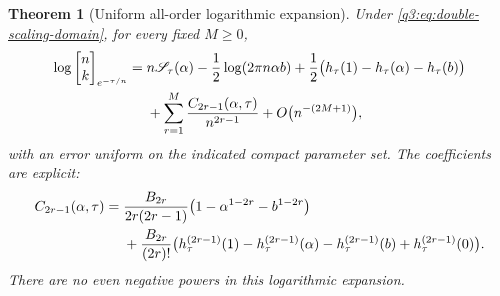 \documentclass[11pt,a4paper,oneside,openany]{book}
\newtheorem{theorem}{Theorem}[chapter]
\theoremstyle{definition}
\theoremstyle{remark}
\newcommand{\GB}[3][q]{\begin{bmatrix}#2\\#3\end{bmatrix}_{#1}}
\newcommand{\Gb}[3]{\GB[#3]{#1}{#2}}
\begin{document}
\begin{theorem}[Uniform all-order logarithmic expansion]\label{q3:thm:double-scaling}
Under \cref{q3:eq:double-scaling-domain}, for every fixed $M\ge0$,
\begin{align}
 \log\Gb nk{e^{-\tau/n}}
 ={}&n\mathscr S_\tau(\alpha)-\frac12\log(2\pi n\alpha b)
       +\frac12\bigl(h_\tau(1)-h_\tau(\alpha)-h_\tau(b)\bigr)
       \notag\\
 &+\sum_{r=1}^M\frac{C_{2r-1}(\alpha,\tau)}{n^{2r-1}}
       +O\bigl(n^{-(2M+1)}\bigr),
 \label{q3:eq:double-scaling-log}
\end{align}
with an error uniform on the indicated compact parameter set. The
coefficients are explicit:
\begin{align}
 C_{2r-1}(\alpha,\tau)
 ={}&\frac{B_{2r}}{2r(2r-1)}
            \bigl(1-\alpha^{1-2r}-b^{1-2r}\bigr) \notag\\
 &+\frac{B_{2r}}{(2r)!}
  \bigl(h_\tau^{(2r-1)}(1)-h_\tau^{(2r-1)}(\alpha)
       -h_\tau^{(2r-1)}(b)+h_\tau^{(2r-1)}(0)\bigr).
 \label{q3:eq:double-scaling-C}
\end{align}
There are no even negative powers in this logarithmic expansion.
\end{theorem}
\end{document}
